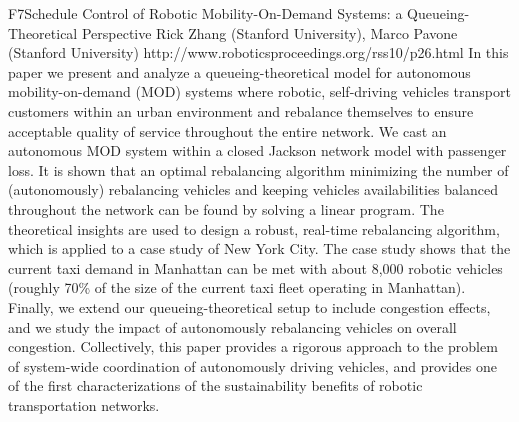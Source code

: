 \begin{spacing}{1.0}
\descriptionPaper
{F7}{Schedule}
{	
Control of Robotic Mobility-On-Demand Systems: a Queueing-Theoretical Perspective 
}
{
Rick Zhang (Stanford University), Marco Pavone (Stanford University)
}
{
http://www.roboticsproceedings.org/rss10/p26.html
}
{
In this paper we present and analyze a queueing-theoretical model for autonomous mobility-on-demand (MOD) systems where robotic, self-driving vehicles transport customers within an urban environment and rebalance themselves to ensure acceptable quality of service throughout the entire network. We cast an autonomous MOD system within a closed Jackson network model with passenger loss. It is shown that an optimal rebalancing algorithm minimizing the number of (autonomously) rebalancing vehicles and keeping vehicles availabilities balanced throughout the network can be found by solving a linear program. The theoretical insights are used to design a robust, real-time rebalancing algorithm, which is applied to a case study of New York City. The case study shows that the current taxi demand in Manhattan can be met with about 8,000 robotic vehicles (roughly 70\% of the size of the current taxi fleet operating in Manhattan). Finally, we extend our queueing-theoretical setup to include congestion effects, and we study the impact of autonomously rebalancing vehicles on overall congestion. Collectively, this paper provides a rigorous approach to the problem of system-wide coordination of autonomously driving vehicles, and provides one of the first characterizations of the sustainability benefits of robotic transportation networks.
}




\end{spacing}
